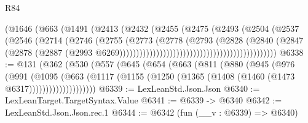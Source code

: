 \begin{lexlean}{R84}
\begin{coremodule}
                                                    (@1646
                                                      (@663
                                                        (@1491
                                                          (@2413
                                                            (@2432
                                                              (@2455
                                                                (@2475
                                                                  (@2493
                                                                    (@2504
                                                                      (@2537
                                                                        (@2546
                                                                          (@2714
                                                                            (@2746
                                                                              (@2755
                                                                                (@2773
                                                                                  (@2778
                                                                                    (@2793
                                                                                      (@2828
                                                                                        (@2840
                                                                                          (@2847
                                                                                            (@2878
                                                                                              (@2887
                                                                                                (@2993
                                                                                                  @6269)))))))))))))))))))))))))))))))))))))))))))))))
@6338 := @131
    (@362
      (@530
        (@557
          (@645
            (@654
              (@663
                (@811
                  (@880
                    (@945
                      (@976
                        (@991
                          (@1095
                            (@663
                              (@1117
                                (@1155 (@1250 (@1365 (@1408 (@1460 (@1473 @6317))))))))))))))))))))
@6339 := LexLeanStd.Json.Json
@6340 := LexLeanTarget.TargetSyntax.Value
@6341 := @6339 -> @6340
@6342 := LexLeanStd.Json.Json.rec.{1}
@6344 := @6342 (fun (__v : @6339) => @6340)

\end{coremodule}
\end{lexlean}
